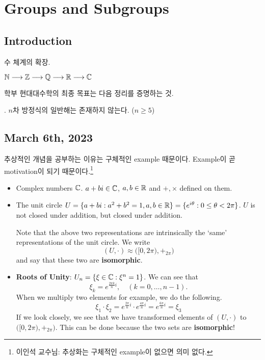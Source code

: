 \chapter{Groups and Subgroups}

\section*{Introduction}



수 체계의 확장.
\begin{center}
    \(\mathbb{N} \longrightarrow \mathbb{Z} \longrightarrow \mathbb{Q} \longrightarrow \mathbb{R} \longrightarrow \mathbb{C}\)
\end{center}

학부 현대대수학의 최종 목표는 다음 정리를 증명하는 것.

\thm. \(n\)차 방정식의 일반해는 존재하지 않는다. (\(n \geq 5\))

\section*{March 6th, 2023}

추상적인 개념을 공부하는 이유는 구체적인 example 때문이다. Example이 곧 motivation이 되기 때문이다.\footnote{이인석 교수님: 추상화는 구체적인 example이 없으면 의미 없다.}

\begin{itemize}
    \item Complex numbers \(\mathbb{C}\). \(a + bi \in \mathbb{C}\), \(a, b \in \mathbb{R}\) and \(+, \times\) defined on them.
    \item The unit circle \(U = \{a + bi : a^2 + b^2 = 1, a, b \in \mathbb{R}\} = \{e^{i\theta} : 0 \leq \theta < 2\pi\}\). \(U\) is not closed under addition, but closed under addition.

          Note that the above two representations are intrinsically the `same' representations of the unit circle. We write
          \[
              (U, \cdot) \approx \bigl([0, 2\pi), +_{2\pi}\bigr)
          \]
          and say that these two are \textbf{isomorphic}.
    \item \textbf{Roots of Unity}: \(U_n = \{\xi \in \mathbb{C} : \xi^n = 1\}\). We can see that
          \[
              \xi_k = e^{\frac{2\pi k}{n}i}, \quad (k = 0, \dots, n - 1).
          \]
          When we multiply two elements for example, we do the following.
          \[
              \xi_1 \cdot \xi_2 = e^{\frac{2\pi}{n}i} \cdot e^{\frac{4\pi}{n}i} = e^{\frac{6\pi}{n}i} = \xi_3
          \]
          If we look closely, we see that we have transformed elements of \((U, \cdot)\) to \(\bigl([0, 2\pi), +_{2\pi}\bigr)\). This can be done because the two sets are \textbf{isomorphic}!
\end{itemize}

\pagebreak
